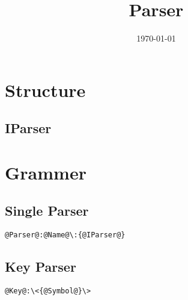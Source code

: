 \documentclass[a4paper,12pt]{article}
\title{Parser}
\date{\today}
\begin{document}
    \maketitle
    \tableofcontents

    \section{Structure}

        \subsection{IParser}

            

    \section{Grammer}

        \subsection{Single Parser}

            \begin{lstlisting}
@Parser@:@Name@\:{@IParser@}
            \end{lstlisting}



        \subsection{Key Parser}

            \begin{lstlisting}
@Key@:\<{@Symbol@}\>
            \end{lstlisting}
\end{document}
